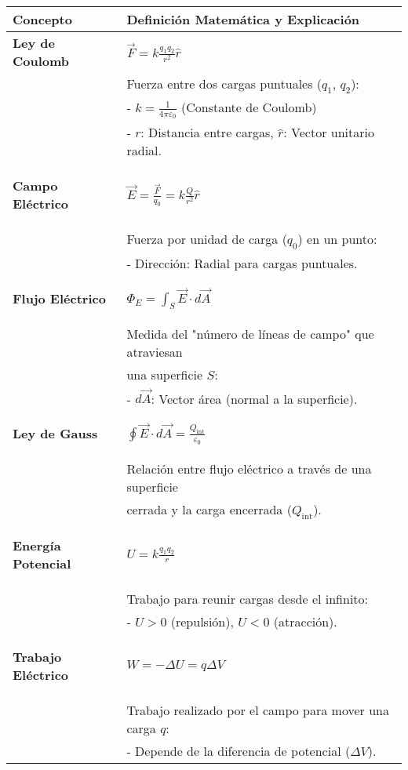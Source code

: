 \begin{table}[h]
    \centering
    \renewcommand{\arraystretch}{1.5}
    \begin{tabular}{|>{\bfseries}l|l|}
        \hline
        \textbf{Concepto} & \textbf{Definición Matemática y Explicación} \\ \hline
        
        \textbf{Ley de Coulomb} & 
        $\vec{F} = k \frac{q_1 q_2}{r^2} \hat{r}$ \\
        & Fuerza entre dos cargas puntuales ($q_1$, $q_2$): \\
        & - $k = \frac{1}{4\pi\varepsilon_0}$ (Constante de Coulomb) \\
        & - $r$: Distancia entre cargas, $\hat{r}$: Vector unitario radial. \\ \hline
        
        \textbf{Campo Eléctrico} & 
        $\vec{E} = \frac{\vec{F}}{q_0} = k \frac{Q}{r^2} \hat{r}$ \\
        & Fuerza por unidad de carga ($q_0$) en un punto: \\
        & - Dirección: Radial para cargas puntuales. \\ \hline
        
        \textbf{Flujo Eléctrico} & 
        $\Phi_E = \int_S \vec{E} \cdot d\vec{A}$ \\
        & Medida del "número de líneas de campo" que atraviesan \\
        & una superficie $S$: \\
        & - $d\vec{A}$: Vector área (normal a la superficie). \\ \hline
        
        \textbf{Ley de Gauss} & 
        $\oint \vec{E} \cdot d\vec{A} = \frac{Q_{\text{int}}}{\varepsilon_0}$ \\
        & Relación entre flujo eléctrico a través de una superficie \\
        & cerrada y la carga encerrada ($Q_{\text{int}}$). \\ \hline
        
        \textbf{Energía Potencial} & 
        $U = k \frac{q_1 q_2}{r}$ \\
        & Trabajo para reunir cargas desde el infinito: \\
        & - $U > 0$ (repulsión), $U < 0$ (atracción). \\ \hline
        
        \textbf{Trabajo Eléctrico} & 
        $W = -\Delta U = q \Delta V$ \\
        & Trabajo realizado por el campo para mover una carga $q$: \\
        & - Depende de la diferencia de potencial ($\Delta V$). \\ \hline
        

\end{tabular}
\end{table}
